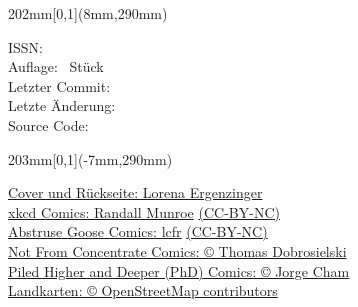 {    \begin{textblock*}{202mm}[0,1](8mm,290mm)
        \begin{flushleft}
            \footnotesize\noindent
            ISSN: \\
            Auflage: \auflage\ Stück\\
            Letzter Commit: \\
            Letzte Änderung: \\
            Source Code: \\

        \end{flushleft}
    \end{textblock*}

    \begin{textblock*}{203mm}[0,1](-7mm,290mm)
        \begin{flushright}
            \footnotesize
            \href{https://mathphys.info/}{Cover und Rückseite: Lorena Ergenzinger}\\ %
            \href{https://xkcd.com/}{xkcd Comics: Randall Munroe} \href{https://creativecommons.org/licenses/by-nc/2.5/}{(CC-BY-NC)}\\
            \href{https://abstrusegoose.com/}{Abstruse Goose Comics: lcfr} \href{https://creativecommons.org/licenses/by-nc/3.0/us/}{(CC-BY-NC)}\\
            \href{https://nfccomic.com}{Not From Concentrate Comics: \copyright{} Thomas Dobrosielski}\\
            \href{https://www.phdcomics.com/}{Piled Higher and Deeper (PhD) Comics: \copyright{} Jorge Cham}\\
            \href{https://www.openstreetmap.org/}{Landkarten: \copyright{} OpenStreetMap contributors}
        \end{flushright}
    \end{textblock*}
}

\graphicspath{{./bilder/}{./}}



